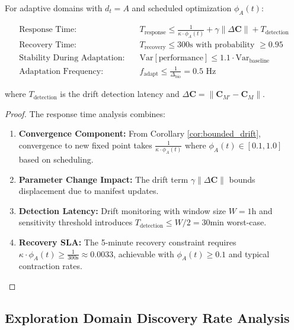 \documentclass{article}
\begin{document}
\begin{theorem}
\label{thm:adaptive_response_extended}
For adaptive domains with $d_t = A$ and scheduled optimization $\phi_A(t)$:

\begin{align}
\text{Response Time:} \quad &T_{\text{response}} \leq \frac{1}{\kappa \cdot \phi_A(t)} + \gamma\|\Delta \mathbf{C}\| + T_{\text{detection}} \\
\text{Recovery Time:} \quad &T_{\text{recovery}} \leq 300\text{s with probability } \geq 0.95 \\
\text{Stability During Adaptation:} \quad &\text{Var}[\text{performance}] \leq 1.1 \cdot \text{Var}_{\text{baseline}} \\
\text{Adaptation Frequency:} \quad &f_{\text{adapt}} \leq \frac{1}{\Delta_{\text{bio}}} = 0.5 \text{ Hz}
\end{align}

where $T_{\text{detection}}$ is the drift detection latency and $\Delta \mathbf{C} = \|\mathbf{C}_{M'} - \mathbf{C}_M\|$.
\end{theorem}

\begin{proof}
The response time analysis combines:
\begin{enumerate}
\item \textbf{Convergence Component:} From Corollary \ref{cor:bounded_drift}, convergence to new fixed point takes $\frac{1}{\kappa \cdot \phi_A(t)}$ where $\phi_A(t) \in [0.1, 1.0]$ based on scheduling.

\item \textbf{Parameter Change Impact:} The drift term $\gamma\|\Delta \mathbf{C}\|$ bounds displacement due to manifest updates.

\item \textbf{Detection Latency:} Drift monitoring with window size $W = 1\text{h}$ and sensitivity threshold introduces $T_{\text{detection}} \leq W/2 = 30\text{min}$ worst-case.

\item \textbf{Recovery SLA:} The 5-minute recovery constraint requires $\kappa \cdot \phi_A(t) \geq \frac{1}{300\text{s}} \approx 0.0033$, achievable with $\phi_A(t) \geq 0.1$ and typical contraction rates.
\end{enumerate}
\end{proof}

\subsection{Exploration Domain Discovery Rate Analysis}
\end{document}
